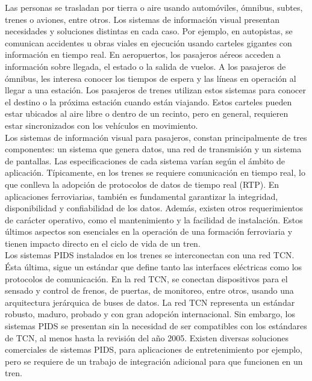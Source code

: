  Las personas se trasladan por tierra o aire usando automóviles, ómnibus, subtes, trenes o aviones, entre otros. Los sistemas de información visual presentan necesidades y soluciones distintas en cada caso. Por ejemplo, en autopistas, se comunican accidentes u obras viales en ejecución usando carteles gigantes con información en tiempo real. En aeropuertos, los pasajeros aéreos acceden a información sobre llegada, el estado o la salida de vuelos. A los pasajeros de ómnibus, les interesa conocer los tiempos de espera y las líneas en operación al llegar a una estación. Los pasajeros de trenes utilizan estos sistemas para conocer el destino o la próxima estación cuando están viajando. Estos carteles pueden estar ubicados al aire libre o dentro de un recinto, pero en general,  requieren estar sincronizados con los vehículos en movimiento. \\

Los sistemas de información visual para pasajeros, constan principalmente de tres componentes: un sistema que genera datos, una red de transmisión y un sistema de pantallas. Las especificaciones de cada sistema varían según el ámbito de aplicación. Típicamente, en los trenes se requiere comunicación en tiempo real, lo que conlleva la adopción de protocolos de datos de tiempo real (RTP). En aplicaciones ferroviarias, también es fundamental garantizar la integridad, disponibilidad y confiabilidad de los datos. Además, existen otros requerimientos de carácter operativo, como el mantenimiento y la facilidad de instalación. Estos últimos aspectos son esenciales en la operación de una formación ferroviaria y tienen impacto directo en el ciclo de vida de un tren.\\

 Los sistemas PIDS instalados en los trenes se interconectan con una red TCN. Ésta última, sigue un estándar que define tanto las interfaces eléctricas como los protocolos de comunicación. En la red TCN, se conectan dispositivos para el sensado y control de frenos, de puertas, de monitoreo, entre otros, usando una arquitectura jerárquica de buses de datos. La red TCN representa un estándar robusto, maduro, probado y con gran adopción internacional. Sin embargo, los sistemas PIDS se presentan sin la necesidad de ser compatibles con los estándares de TCN, al menos hasta la revisión del año 2005. Existen diversas soluciones comerciales de sistemas PIDS, para aplicaciones de entretenimiento por ejemplo, pero se requiere de un trabajo de integración adicional para que funcionen en un tren.\\
 
